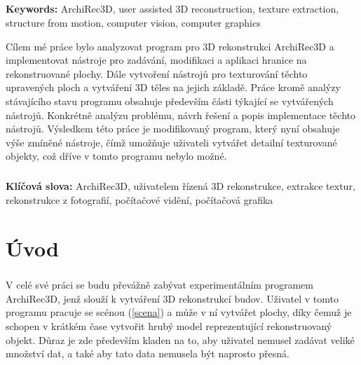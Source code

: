 \documentclass[11pt,twoside,a4paper]{book}
\begin{document}
	\paragraph{}
	\noindent
	\textbf{Keywords: }ArchiRec3D, user assisted 3D reconstruction, texture extraction, structure from motion, computer vision, computer graphics
	

	\baselineskip

	\noindent
	Cílem mé práce bylo analyzovat program pro 3D rekonstrukci ArchiRec3D a implementovat nástroje pro zadávání, modifikaci a aplikaci hranice na rekonstruované plochy. Dále vytvoření nástrojů pro texturování těchto upravených ploch a vytváření 3D těles na jejich základě.
	Práce kromě analýzy stávajícího stavu programu obsahuje především části týkající se vytvářených nástrojů. Konkrétně analýzu problému, návrh řešení a popis implementace těchto nástrojů.
	Výsledkem této práce je modifikovaný program, který nyní obsahuje výše zmíněné nástroje, čímž umožňuje uživateli vytvářet detailní texturované objekty, což dříve v tomto programu nebylo možné.
	\paragraph{}
	\noindent
	\textbf{Klíčová slova: }ArchiRec3D, uživatelem řízená 3D rekonstrukce, extrakce textur, rekonstrukce z fotografií, počítačové vidění, počítačová grafika
	
	\tableofcontents		%

	\listoffigures			%

	\mainbodystarts

\chapter{Úvod}
\paragraph{}
V celé své práci se budu převážně zabývat experimentálním programem ArchiRec3D\cite{ViCiTiS}, jenž slouží k vytváření 3D rekonstrukcí budov. Uživatel v tomto programu pracuje se scénou (\ref{scena}) a může v ní vytvářet plochy, díky čemuž je schopen v krátkém čase vytvořit hrubý model reprezentující rekonstruovaný objekt. Důraz je zde především kladen na to, aby uživatel nemusel zadávat veliké množství dat, a také aby tato data nemusela být naprosto přesná.
\end{document}

